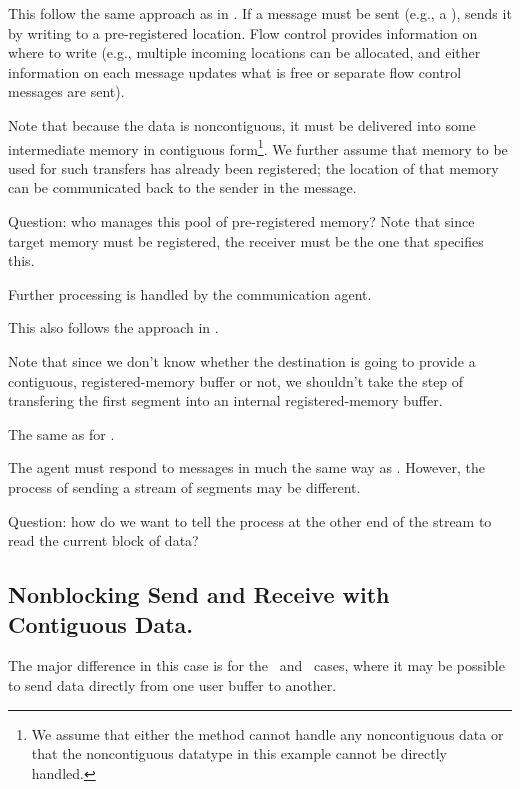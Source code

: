 
This follow the same approach as in \tcpname.  
If a message must be sent (e.g., a
),  sends it by writing to
a pre-registered location.  Flow control provides information on where to
write (e.g., multiple incoming locations can be allocated, and either
information on each message updates what is free or separate flow control
messages are sent).   

Note that because the data is noncontiguous, it must be delivered into some
intermediate memory in contiguous form\footnote{We assume that either the
  method cannot handle any noncontiguous data or that the noncontiguous
  datatype in this example cannot be directly handled.}.  We further assume
that memory to be used for such transfers has already been registered; the
location of that memory can be communicated back to the sender in the
 message.  

Question: who manages this pool of pre-registered memory?  Note that since
target memory must be registered, the receiver must be the one that specifies
this.  

Further processing is handled by the communication agent.


This also follows the approach in \tcpname.

Note that since we don't know whether the destination is going to provide a
contiguous, registered-memory buffer or not, we shouldn't take the step of
transfering the first segment into an internal registered-memory buffer.


The same as for \tcpname.  


The agent must respond to messages in much the same way as \tcpname.  However,
the process of sending a stream of segments may be different. 

Question: how do we want to tell the process at the other end of the stream to
read the current block of data?

\subsection{Nonblocking Send and Receive with Contiguous Data.}

The major difference in this case is for the \shmemname\ and \vianame\ cases,
where it may be possible to send data directly from one user buffer to
another.  

